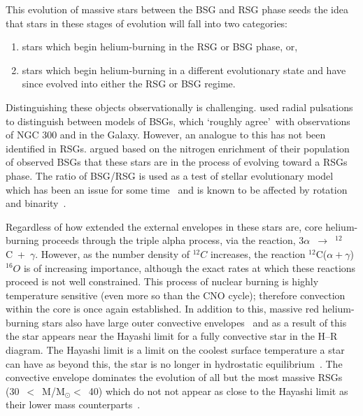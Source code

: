 This evolution of massive stars between the BSG and RSG phase seeds the idea that stars in these stages of evolution will fall into two categories:

\begin{enumerate}
    \item stars which begin helium-burning in the RSG or BSG phase, or,
    \item stars which begin helium-burning in a different evolutionary state and have since evolved into either the RSG or BSG regime.
\end{enumerate}

Distinguishing these objects observationally is challenging.
\cite{Saio13} used radial pulsations to distinguish between models of BSGs, which \textquoteleft roughly agree\textquoteright ~with observations of NGC 300 and in the Galaxy.
However, an analogue to this has not been identified in RSGs.
\cite{2012A&A...542A..79C} argued based on the nitrogen enrichment of their population of observed BSGs that these stars are in the process of evolving toward a RSGs phase.
The ratio of BSG/RSG is used as a test of stellar evolutionary model which has been an issue for some time~\citep{1995A&A...295..685L} and is known to be affected by rotation~\citep{2001A&A...373..555M,2012A&A...537A.146E} and binarity~\citep{2008MNRAS.384.1109E}.


Regardless of how extended the external envelopes in these stars are, core helium-burning proceeds through the triple alpha process, via the reaction, 3$\alpha$~$\rightarrow$~$^{12}$C~+~$\gamma$.
However, as the number density of $^{12}C$ increases, the reaction $^{12}$C($\alpha+\gamma$)$^{16}O$ is of increasing importance, although the exact rates at which these reactions proceed is not well constrained.
This process of nuclear burning is highly temperature sensitive (even more so than the CNO cycle); therefore convection within the core is once again established.
In addition to this, massive red helium-burning stars also have large outer convective envelopes~\citep{2012sse..book.....K} and as a result of this the star appears near the Hayashi limit for a fully convective star in the H--R diagram.
The Hayashi limit is a limit on the coolest surface temperature a star can have as beyond this, the star is no longer in hydrostatic equilibrium~\citep{1961PASJ...13..442H}.
The convective envelope dominates the evolution of all but the most massive RSGs (30~$<$~M/M$_{\odot}<$~40) which do not not appear as close to the Hayashi limit as their lower mass counterparts~\citep[see Figure 1 in][]{Saio13}.

